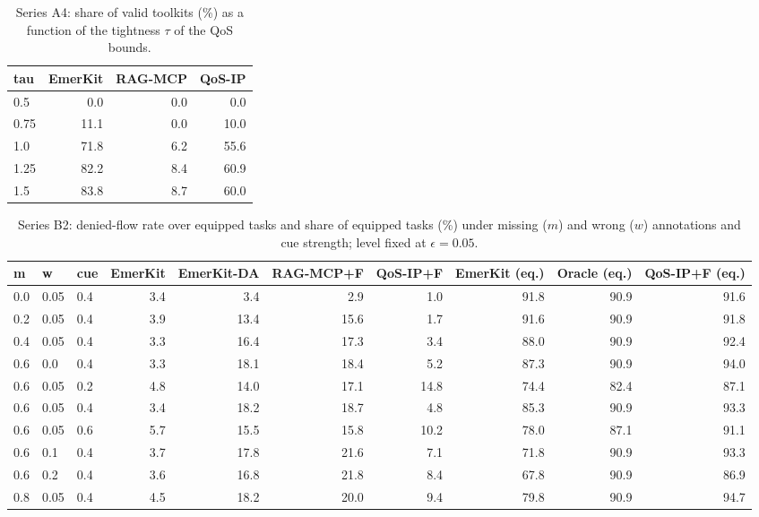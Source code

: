 \begin{table}[!ht]\centering\caption{Series A4: share of valid toolkits (\%) as a function of the tightness $\tau$ of the QoS bounds.}\label{tab:a4}\scriptsize
\begin{tabular}{lrrr}\toprule
tau & EmerKit & RAG-MCP & QoS-IP \\ \midrule
0.5 & 0.0 & 0.0 & 0.0 \\
0.75 & 11.1 & 0.0 & 10.0 \\
1.0 & 71.8 & 6.2 & 55.6 \\
1.25 & 82.2 & 8.4 & 60.9 \\
1.5 & 83.8 & 8.7 & 60.0 \\
\bottomrule\end{tabular}\end{table}
\begin{table}[!ht]\centering\caption{Series B2: denied-flow rate over equipped tasks and share of equipped tasks (\%) under missing ($m$) and wrong ($w$) annotations and cue strength; level fixed at $\epsilon=0.05$.}\label{tab:b2}\scriptsize
\begin{tabular}{lllrrrrrrr}\toprule
m & w & cue & EmerKit & EmerKit-DA & RAG-MCP+F & QoS-IP+F & EmerKit (eq.) & Oracle (eq.) & QoS-IP+F (eq.) \\ \midrule
0.0 & 0.05 & 0.4 & 3.4 & 3.4 & 2.9 & 1.0 & 91.8 & 90.9 & 91.6 \\
0.2 & 0.05 & 0.4 & 3.9 & 13.4 & 15.6 & 1.7 & 91.6 & 90.9 & 91.8 \\
0.4 & 0.05 & 0.4 & 3.3 & 16.4 & 17.3 & 3.4 & 88.0 & 90.9 & 92.4 \\
0.6 & 0.0 & 0.4 & 3.3 & 18.1 & 18.4 & 5.2 & 87.3 & 90.9 & 94.0 \\
0.6 & 0.05 & 0.2 & 4.8 & 14.0 & 17.1 & 14.8 & 74.4 & 82.4 & 87.1 \\
0.6 & 0.05 & 0.4 & 3.4 & 18.2 & 18.7 & 4.8 & 85.3 & 90.9 & 93.3 \\
0.6 & 0.05 & 0.6 & 5.7 & 15.5 & 15.8 & 10.2 & 78.0 & 87.1 & 91.1 \\
0.6 & 0.1 & 0.4 & 3.7 & 17.8 & 21.6 & 7.1 & 71.8 & 90.9 & 93.3 \\
0.6 & 0.2 & 0.4 & 3.6 & 16.8 & 21.8 & 8.4 & 67.8 & 90.9 & 86.9 \\
0.8 & 0.05 & 0.4 & 4.5 & 18.2 & 20.0 & 9.4 & 79.8 & 90.9 & 94.7 \\
\bottomrule\end{tabular}\end{table}
